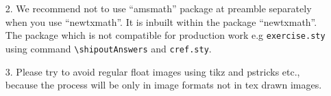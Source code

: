 \documentclass[graybox]{svmono}
\begin{document}
\begin{sloppy}
\begin{enumerate}
\item[2.] We recommend not to use ``amsmath'' package at preamble separately when you use ``newtxmath''. It is inbuilt within the package ``newtxmath''. The package which is not compatible for production work e.g \verb|exercise.sty| using command \verb|\shipoutAnswers| and \verb|cref.sty|.

\item[3.] Please try to avoid regular float images using tikz and pstricks etc., because the process will be only in image formats not in tex drawn images.
\end{enumerate}


\end{sloppy}
\end{document}
